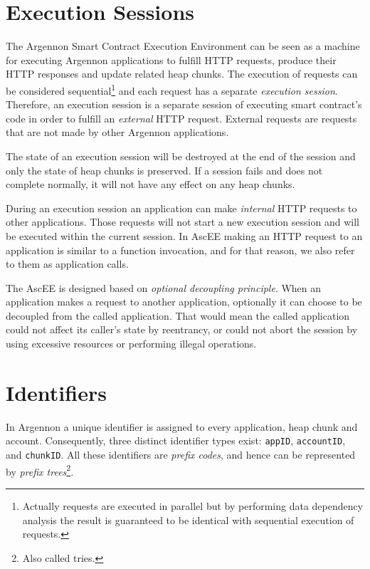 \section{Execution Sessions}\label{sec:sessions}

The Argennon Smart Contract Execution Environment can be seen as a machine for executing Argennon applications to
fulfill HTTP requests, produce their HTTP responses and update related heap chunks. The execution of requests can be
considered sequential\footnote{Actually requests are executed in parallel but by performing data dependency analysis the
result is guaranteed to be identical with sequential execution of requests.} and each request has a separate
\emph{execution session}. Therefore, an execution
session is a separate session of executing smart contract's code in order to fulfill an \emph{external} HTTP request.
External requests are requests that are not made by other Argennon applications.

The state of an execution session will be
destroyed at the end of the session and only the state of heap chunks is preserved. If a session fails and does not
complete normally, it will not have any effect on any heap chunks.

During an execution session an application can make \emph{internal} HTTP requests to other applications. Those
requests will not start a new execution session and will be executed within the current session. In AscEE making an
HTTP request to an application is similar to a function invocation, and for that reason, we also refer to them as
application calls.

The AscEE is designed based on \emph{optional decoupling principle}. When an application makes a request to another
application, optionally it can choose to be decoupled from the called application. That would mean the called
application could not affect its caller's state by reentrancy, or could not abort the session by using excessive
resources or performing illegal operations.


\section{Identifiers}\label{sec:identifiers}

In Argennon a unique identifier is assigned to every application, heap chunk and account. Consequently, three distinct
identifier types exist: \texttt{appID}, \texttt{accountID}, and \texttt{chunkID}.
All these identifiers are \emph{prefix codes}, and hence can be represented by
\emph{prefix trees}\footnote{Also called tries.}.

